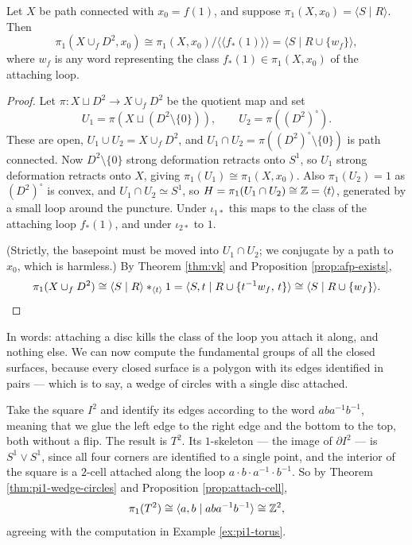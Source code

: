 \documentclass[a4paper]{scrartcl}
\newcommand{\genby}[1]{\langle #1 \rangle}
\newcommand{\ngenby}[1]{\langle\!\langle #1 \rangle\!\rangle}
\begin{document}
\begin{proposition} \label{prop:attach-cell}
	Let $X$ be path connected with $x_0 = f(1)$, and suppose $\pi_1(X,x_0) = \genby{S \mid R}$. Then
	$$
	\pi_1(X\cup_f D^2, x_0) \cong \pi_1(X, x_0)\big/\ngenby{f_*(1)} = \genby{S \mid R \cup \{w_f\}},
	$$
	where $w_f$ is any word representing the class $f_*(1) \in \pi_1(X,x_0)$ of the attaching loop.
\end{proposition}
\begin{proof}
	Let $\pi: X \sqcup D^2 \to X\cup_f D^2$ be the quotient map and set
	$$
	U_1 = \pi(X \sqcup (D^2\setminus\{0\})), \qquad U_2 = \pi((D^2)^\circ).
	$$
	These are open, $U_1 \cup U_2 = X \cup_f D^2$, and $U_1 \cap U_2 = \pi((D^2)^\circ \setminus \{0\})$ is path connected. Now $D^2 \setminus\{0\}$ strong deformation retracts onto $S^1$, so $U_1$ strong deformation retracts onto $X$, giving $\pi_1(U_1) \cong \pi_1(X, x_0)$. Also $\pi_1(U_2) = 1$ as $(D^2)^\circ$ is convex, and $U_1 \cap U_2 \simeq S^1$, so $H = \pi_1(U_1\cap U_2) \cong \Z = \genby{t}$, generated by a small loop around the puncture. Under $\iota_{1*}$ this maps to the class of the attaching loop $f_*(1)$, and under $\iota_{2*}$ to $1$.

	(Strictly, the basepoint must be moved into $U_1 \cap U_2$; we conjugate by a path to $x_0$, which is harmless.) By Theorem \ref{thm:vk} and Proposition \ref{prop:afp-exists},
	$$
	\pi_1(X\cup_f D^2) \cong \genby{S \mid R} *_{\genby{t}} 1 = \genby{S, t \mid R \cup \{t^{-1}w_f, \, t\}} \cong \genby{S \mid R \cup \{w_f\}}. \qedhere
	$$
\end{proof}

In words: attaching a disc kills the class of the loop you attach it along, and nothing
else. We can now compute the fundamental groups of all the closed surfaces, because every
closed surface is a polygon with its edges identified in pairs --- which is to say, a
wedge of circles with a single disc attached.

\begin{example} \label{ex:torus-vk}
	Take the square $I^2$ and identify its edges according to the word $aba^{-1}b^{-1}$, meaning that we glue the left edge to the right edge and the bottom to the top, both without a flip. The result is $T^2$. Its $1$-skeleton --- the image of $\partial I^2$ --- is $S^1 \vee S^1$, since all four corners are identified to a single point, and the interior of the square is a $2$-cell attached along the loop $a\cdot b\cdot a^{-1}\cdot b^{-1}$. So by Theorem \ref{thm:pi1-wedge-circles} and Proposition \ref{prop:attach-cell},
	$$
	\pi_1(T^2) \cong \genby{a, b \mid aba^{-1}b^{-1}} \cong \Z^2,
	$$
	agreeing with the computation in Example \ref{ex:pi1-torus}.
\end{example}
\end{document}
